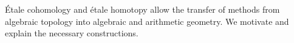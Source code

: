 \'Etale cohomology and \'etale homotopy allow the transfer of methods from algebraic topology into algebraic and arithmetic geometry. We motivate and explain the necessary constructions.